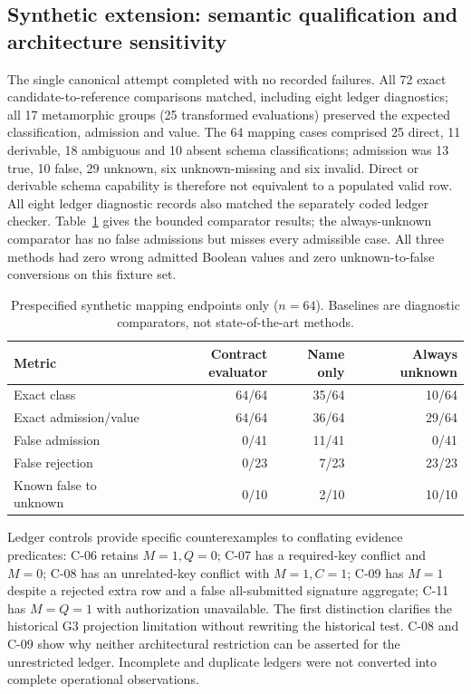 \documentclass[preprint,12pt]{elsarticle}
\begin{document}
\subsection{Synthetic extension: semantic qualification and architecture sensitivity}
\label{sec:extensionresults}
The single canonical attempt completed with no recorded failures. All 72 exact candidate-to-reference comparisons matched, including eight ledger diagnostics; all 17 metamorphic groups (25 transformed evaluations) preserved the expected classification, admission and value. The 64 mapping cases comprised 25 direct, 11 derivable, 18 ambiguous and 10 absent schema classifications; admission was 13 true, 10 false, 29 unknown, six unknown-missing and six invalid. Direct or derivable schema capability is therefore not equivalent to a populated valid row. All eight ledger diagnostic records also matched the separately coded ledger checker. Table~\ref{tab:extensionmapping} gives the bounded comparator results; the always-unknown comparator has no false admissions but misses every admissible case. All three methods had zero wrong admitted Boolean values and zero unknown-to-false conversions on this fixture set.

\begin{table}[H]
\centering
\small
\caption{Prespecified synthetic mapping endpoints only ($n=64$). Baselines are diagnostic comparators, not state-of-the-art methods.}
\label{tab:extensionmapping}
\begin{tabular}{lrrr}
\toprule
Metric & Contract evaluator & Name only & Always unknown \\
\midrule
Exact class & 64/64 & 35/64 & 10/64 \\
Exact admission/value & 64/64 & 36/64 & 29/64 \\
False admission & 0/41 & 11/41 & 0/41 \\
False rejection & 0/23 & 7/23 & 23/23 \\
Known false to unknown & 0/10 & 2/10 & 10/10 \\
\bottomrule
\end{tabular}
\end{table}

Ledger controls provide specific counterexamples to conflating evidence predicates: C-06 retains $M=1,Q=0$; C-07 has a required-key conflict and $M=0$; C-08 has an unrelated-key conflict with $M=1,C=1$; C-09 has $M=1$ despite a rejected extra row and a false all-submitted signature aggregate; C-11 has $M=Q=1$ with authorization unavailable. The first distinction clarifies the historical G3 projection limitation without rewriting the historical test. C-08 and C-09 show why neither architectural restriction can be asserted for the unrestricted ledger. Incomplete and duplicate ledgers were not converted into complete operational observations.
\end{document}
